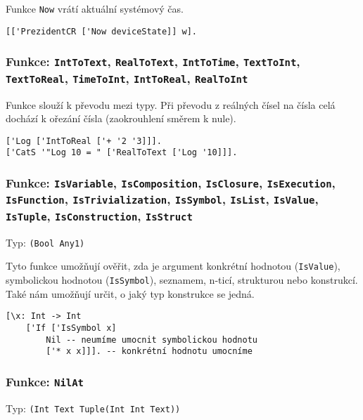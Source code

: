 Funkce \lstinline{Now} vrátí aktuální systémový čas.

\begin{lstlisting}[caption={Ukázka využití Now}]
[['PrezidentCR ['Now deviceState]] w].
\end{lstlisting}

\subsubsection*{Funkce: \lstinline{IntToText},
\lstinline{RealToText},
\lstinline{IntToTime},
\lstinline{TextToInt},
\lstinline{TextToReal},
\lstinline{TimeToInt},
\lstinline{IntToReal},
\lstinline{RealToInt}
}

Funkce slouží k převodu mezi typy. Při převodu z reálných čísel na čísla celá dochází k ořezání
čísla (zaokrouhlení směrem k nule).

\begin{lstlisting}[caption={Ukázka využití konverzí}]
['Log ['IntToReal ['+ '2 '3]]].
['CatS '"Log 10 = " ['RealToText ['Log '10]]].
\end{lstlisting}

\subsubsection*{Funkce:
\lstinline{IsVariable},
\lstinline{IsComposition},
\lstinline{IsClosure},
\lstinline{IsExecution},
\lstinline{IsFunction},
\lstinline{IsTrivialization},
\lstinline{IsSymbol},
\lstinline{IsList},
\lstinline{IsValue},
\lstinline{IsTuple},
\lstinline{IsConstruction},
\lstinline{IsStruct}
}

Typ: \lstinline{(Bool Any1)}

Tyto funkce umožňují ověřit, zda je argument konkrétní hodnotou (\lstinline{IsValue}), symbolickou
hodnotou (\lstinline{IsSymbol}), seznamem, n-ticí, strukturou nebo konstrukcí. Také nám umožňují
určit, o jaký typ konstrukce se jedná.

\begin{lstlisting}[caption={Ukázka využití IsSymbol}]
[\x: Int -> Int
    ['If ['IsSymbol x]
        Nil -- neumíme umocnit symbolickou hodnotu
        ['* x x]]]. -- konkrétní hodnotu umocníme
\end{lstlisting}

\subsubsection*{Funkce: \lstinline{NilAt}}\label{nilat-fn}
Typ: \lstinline{(Int Text Tuple(Int Int Text))}

